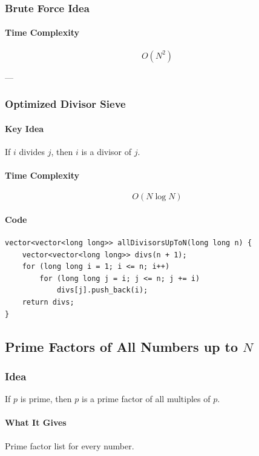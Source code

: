 \documentclass[11pt]{article}
\begin{document}
\subsubsection{Brute Force Idea}

\paragraph{Time Complexity}
\[
O(N^2)
\]

---

\subsubsection{Optimized Divisor Sieve}

\paragraph{Key Idea}
If $i$ divides $j$, then $i$ is a divisor of $j$.

\paragraph{Time Complexity}
\[
O(N \log N)
\]

\paragraph{Code}
\begin{lstlisting}
vector<vector<long long>> allDivisorsUpToN(long long n) {
    vector<vector<long long>> divs(n + 1);
    for (long long i = 1; i <= n; i++)
        for (long long j = i; j <= n; j += i)
            divs[j].push_back(i);
    return divs;
}
\end{lstlisting}

\subsection{Prime Factors of All Numbers up to $N$}

\subsubsection{Idea}
If $p$ is prime, then $p$ is a prime factor of all multiples of $p$.

\paragraph{What It Gives}
Prime factor list for every number.
\end{document}

